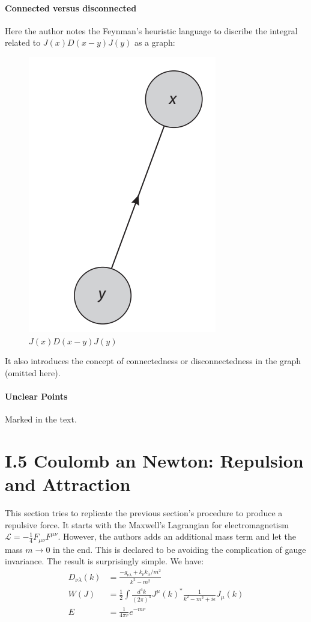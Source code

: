 \documentclass{book}
\numberwithin{equation}{subsection} %
\theoremstyle{definition}
\begin{document}
\paragraph{Connected versus disconnected}
Here the author notes the Feynman's heuristic language to discribe
the integral related to $J(x)D(x-y)J(y)$ as a graph:
\begin{figure}[H]
    \centering
    \includegraphics[width=0.6\linewidth]{pics/J(x)D(x-y)J(y).png}
    \caption{$J(x)D(x-y)J(y)$}
\end{figure}
It also introduces the concept of connectedness or disconnectedness
in the graph (omitted here).

\paragraph{Unclear Points} Marked in the text.

\section{I.5 Coulomb an Newton: Repulsion and Attraction}
This section tries to replicate the previous section's procedure to
produce a repulsive force. It starts with the Maxwell's Lagrangian for
electromagnetism $\mathcal{L}=-\frac{1}{4} F_{\mu\nu}F^{\mu\nu}$.
However, the authors adds an additional mass term and let the mass
$m\to 0$ in the end. This is declared to be avoiding the complication of
gauge invariance. The result is surprisingly simple. We have:
\begin{align}
    D_{\nu\lambda}(k)&=\frac{-g_{\nu\lambda}+k_\nu k_\lambda/m^2}
        {k^2-m^2}
    \nonumber\\
    W(J)&=\frac{1}{2} \int \frac{d^4k}{(2\pi)^4}
        J^\mu (k)^* \frac{1}{k^2-m^2+i\epsilon} J_\mu(k)
    \nonumber\\
    E&=\frac{1}{4\pi r}e^{-mr} 
\end{align}
\end{document}
